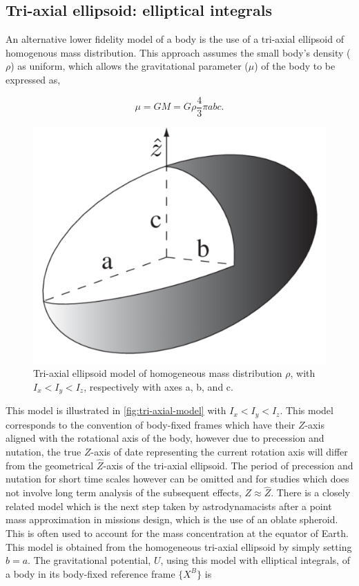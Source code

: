 \subsection{Tri-axial ellipsoid: elliptical integrals\label{subsub:tri_axial_ellipsoid}}

An alternative lower fidelity model of a body is the use of a tri-axial
ellipsoid of homogenous mass distribution. This approach assumes the small
body's density ($\rho$) as uniform, which allows the gravitational parameter
($\mu$) of the body to be expressed as,

\begin{equation}
    \mu=GM=G\rho\frac{4}{3}\pi{abc}.
\end{equation}

\begin{figure}[h]
    \centering
    \includegraphics[width=0.35\linewidth]{graphics/tri-axial.png}
    \caption{Tri-axial ellipsoid model \textmd{of homogeneous mass distribution $\rho$, with $I_x<I_y<I_z$, respectively with axes a, b, and c.}}
    \label{fig:tri-axial-model}
\end{figure}

This model is illustrated in \autoref{fig:tri-axial-model} with $I_x<I_y<I_z$.
This model corresponds to the convention of body-fixed frames which have their
$Z$-axis aligned with the rotational axis of the body, however due to precession
and nutation, the true $Z$-axis of date representing the current rotation axis
will differ from the geometrical $\hat{Z}$-axis of the tri-axial ellipsoid. The
period of precession and nutation for short time scales however can be omitted
and for studies which does not involve long term analysis of the subsequent
effects, $Z\approx{\hat{Z}}$. There is a closely related model which is the next
step taken by astrodynamacists after a point mass approximation in missions
design, which is the use of an oblate spheroid. This is often used to account
for the mass concentration at the equator of Earth. This model is obtained from
the homogeneous tri-axial ellipsoid by simply setting $b=a$. The gravitational
potential, $U$, using this model with elliptical integrals, of a body in its
body-fixed reference frame $\{X^B\}$ is

